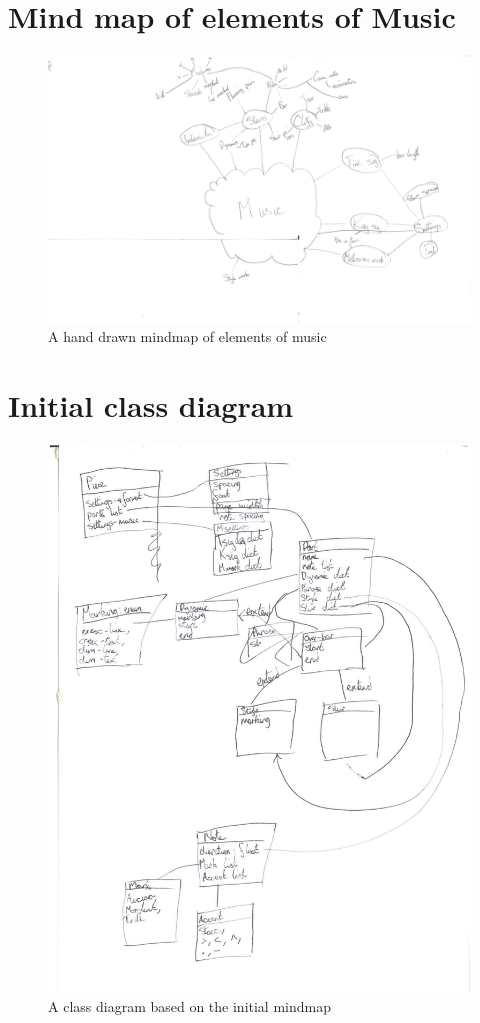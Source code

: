 \begin{appendices}
\section{Mind map of elements of Music}
\begin{figure}[h]
\centering
\includegraphics[width=500pt]{mindmap}
\caption{A hand drawn mindmap of elements of music}	
\end{figure}

\section{Initial class diagram}
\begin{figure}[H]
\centering
\includegraphics[width=400pt]{class-diagram}
\caption{A class diagram based on the initial mindmap}
\end{figure}


\end{appendices}
